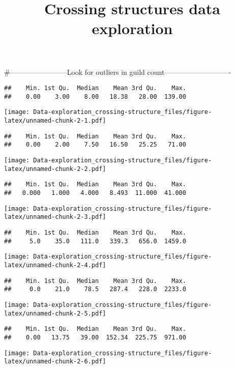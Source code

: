 \documentclass[]{article}
\title{Crossing structures data exploration}
\author{}
\date{\vspace{-2.5em}}
\begin{document}
\maketitle

\#------------------------Look for outliers in guild
count----------------------------

\begin{verbatim}
##    Min. 1st Qu.  Median    Mean 3rd Qu.    Max. 
##    0.00    3.00    8.00   18.38   28.00  139.00
\end{verbatim}

\texttt{[image: Data-exploration\_crossing-structure\_files/figure-latex/unnamed-chunk-2-1.pdf]}

\begin{verbatim}
##    Min. 1st Qu.  Median    Mean 3rd Qu.    Max. 
##    0.00    2.00    7.50   16.50   25.25   71.00
\end{verbatim}

\texttt{[image: Data-exploration\_crossing-structure\_files/figure-latex/unnamed-chunk-2-2.pdf]}

\begin{verbatim}
##    Min. 1st Qu.  Median    Mean 3rd Qu.    Max. 
##   0.000   1.000   4.000   8.493  11.000  41.000
\end{verbatim}

\texttt{[image: Data-exploration\_crossing-structure\_files/figure-latex/unnamed-chunk-2-3.pdf]}

\begin{verbatim}
##    Min. 1st Qu.  Median    Mean 3rd Qu.    Max. 
##     5.0    35.0   111.0   339.3   656.0  1459.0
\end{verbatim}

\texttt{[image: Data-exploration\_crossing-structure\_files/figure-latex/unnamed-chunk-2-4.pdf]}

\begin{verbatim}
##    Min. 1st Qu.  Median    Mean 3rd Qu.    Max. 
##     0.0    21.0    78.5   287.4   228.0  2233.0
\end{verbatim}

\texttt{[image: Data-exploration\_crossing-structure\_files/figure-latex/unnamed-chunk-2-5.pdf]}

\begin{verbatim}
##    Min. 1st Qu.  Median    Mean 3rd Qu.    Max. 
##    0.00   13.75   39.00  152.34  225.75  971.00
\end{verbatim}

\texttt{[image: Data-exploration\_crossing-structure\_files/figure-latex/unnamed-chunk-2-6.pdf]}
\end{document}
